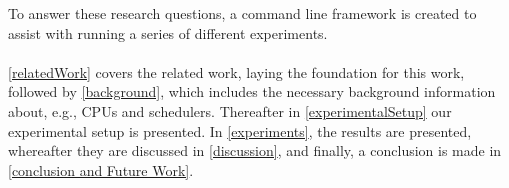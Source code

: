 

To answer these research questions, a command line framework is created to assist with running a series of different experiments.

\paragraph{}
\cref{relatedWork} covers the related work, laying the foundation for this work, followed by \cref{background}, which includes the necessary background information about, e.g., CPUs and schedulers. Thereafter in \cref{experimentalSetup} our experimental setup is presented. %
In \cref{experiments}, the results are presented, whereafter they are discussed in \cref{discussion}, and finally, a conclusion is made in \cref{conclusion and Future Work}. 


